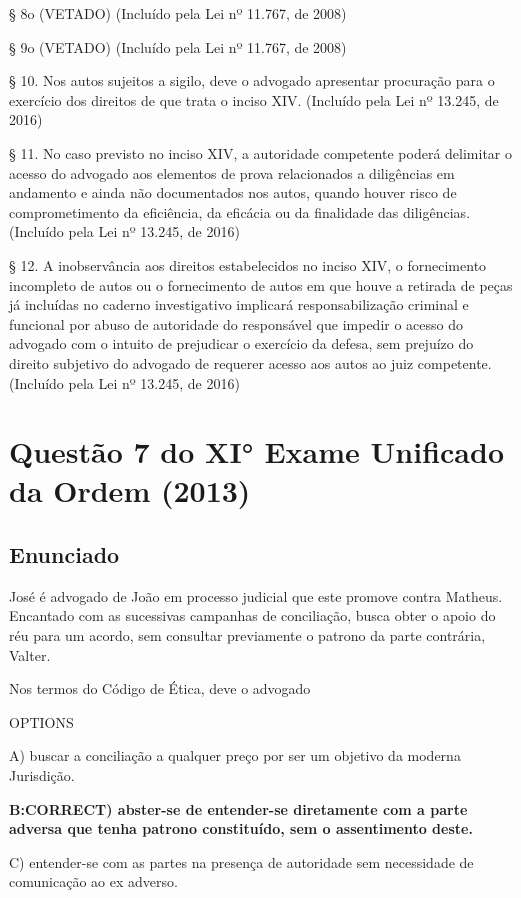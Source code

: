 \documentclass[12pt]{article}
\begin{document}
§ 8o  (VETADO)       (Incluído pela Lei nº 11.767, de 2008)

§ 9o  (VETADO)       (Incluído pela Lei nº 11.767, de 2008)

§ 10.  Nos autos sujeitos a sigilo, deve o advogado apresentar procuração para o exercício dos direitos de que trata o inciso XIV.          (Incluído pela Lei nº 13.245, de 2016)

§ 11.  No caso previsto no inciso XIV, a autoridade competente poderá delimitar o acesso do advogado aos elementos de prova relacionados a diligências em andamento e ainda não documentados nos autos, quando houver risco de comprometimento da eficiência, da eficácia ou da finalidade das diligências.          (Incluído pela Lei nº 13.245, de 2016)

§ 12.  A inobservância aos direitos estabelecidos no inciso XIV, o fornecimento incompleto de autos ou o fornecimento de autos em que houve a retirada de peças já incluídas no caderno investigativo implicará responsabilização criminal e funcional por abuso de autoridade do responsável que impedir o acesso do advogado com o intuito de prejudicar o exercício da defesa, sem prejuízo do direito subjetivo do advogado de requerer acesso aos autos ao juiz competente.         (Incluído pela Lei nº 13.245, de 2016)

\section{Questão 7 do XI° Exame Unificado da Ordem (2013)}

\subsection{Enunciado}

José é advogado de João em processo judicial que este 
promove contra Matheus. Encantado com as sucessivas 
campanhas de conciliação, busca obter o apoio do réu para 
um acordo, sem consultar previamente o patrono da parte 
contrária, Valter.  
 
Nos termos do Código de Ética, deve o advogado 
 
OPTIONS

A) buscar a conciliação a qualquer preço por ser um objetivo 
da moderna Jurisdição.  

\textbf{B:CORRECT) abster-se de entender-se diretamente com a parte adversa que tenha patrono constituído, sem o assentimento deste.} 

C) entender-se com as partes na presença de autoridade sem 
necessidade de comunicação ao ex adverso.  
\end{document}
